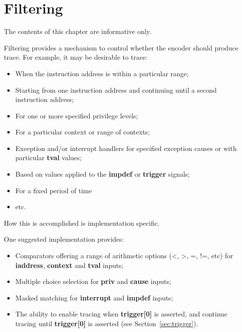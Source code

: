 \chapter{Filtering} \label{ch:filtering}

The contents of this chapter are informative only.

Filtering provides a mechanism to control whether the encoder should produce trace.  For example,
it may be desirable to trace:

\begin{itemize}
  \item When the instruction address is within a particular range;
  \item Starting from one instruction address and continuing until a second instruction address;
  \item For one or more specified privilege levels;
  \item For a particular context or range of contexts;
  \item Exception and/or interrupt handlers for specified exception causes or with particular \textbf{tval} values;
  \item Based on values applied to the \textbf{impdef} or \textbf{trigger} signals;
  \item For a fixed period of time
  \item etc.
\end{itemize}

How this is accomplished is implementation specific.  

One suggested implementation provides: 

\begin{itemize}
  \item Comparators offering a range of arithmetic options (<, >, =, !=, etc) for \textbf{iaddress}, 
    \textbf{context} and \textbf{tval} inputs;
  \item Multiple choice selection for \textbf{priv} and \textbf{cause} inputs;
  \item Masked matching for \textbf{interrupt} and \textbf{impdef} inputs;
  \item The ability to enable tracing when \textbf{trigger[0]} is asserted, and continue tracing 
    until \textbf{trigger[0]} is asserted (see Section~\ref{sec:trigger}).
\end{itemize}


